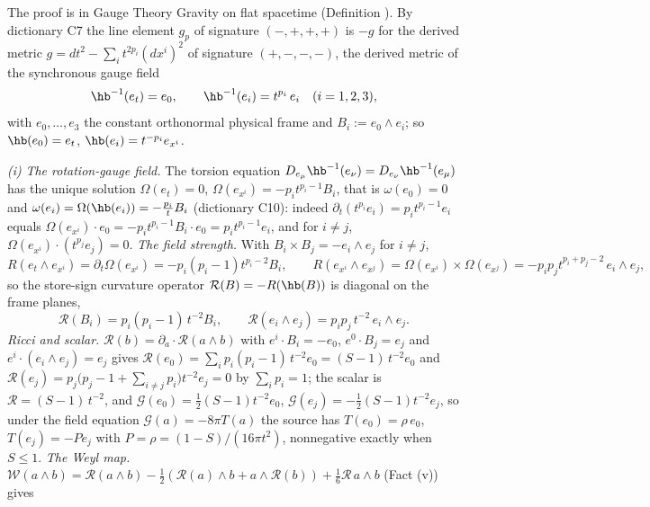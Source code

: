 The proof is in Gauge Theory Gravity on flat spacetime (Definition ). By dictionary C7 the line element $g_{p}$ of signature $(-,+,+,+)$ is $-g$ for the derived metric $g = dt^{2} - \sum_{i}t^{2p_{i}}(dx^{i})^{2}$ of signature $(+,-,-,-)$, the derived metric of the synchronous gauge field
\[
\hb^{-1}(e_{t}) = e_{0}, \qquad \hb^{-1}(e_{i}) = t^{p_{i}}\,e_{i} \quad (i = 1, 2, 3),
\]
with $e_{0}, \dots, e_{3}$ the constant orthonormal physical frame and $B_{i} := e_{0}\wedge e_{i}$; so $\hb(e_{0}) = e_{t}$, $\hb(e_{i}) = t^{-p_{i}}e_{x^{i}}$.

\emph{(i)} \emph{The rotation-gauge field.} The torsion equation $D_{e_\mu}\hb^{-1}(e_\nu) = D_{e_\nu}\hb^{-1}(e_\mu)$ has the unique solution $\Omega(e_{t}) = 0$, $\Omega(e_{x^{i}}) = -p_{i}t^{p_{i}-1}B_{i}$, that is $\omega(e_{0}) = 0$ and $\omega(e_{i}) = \Omega(\hb(e_{i})) = -\tfrac{p_{i}}{t}B_{i}$ (dictionary C10): indeed $\partial_{t}(t^{p_{i}}e_{i}) = p_{i}t^{p_{i}-1}e_{i}$ equals $\Omega(e_{x^{i}})\cdot e_{0} = -p_{i}t^{p_{i}-1}B_{i}\cdot e_{0} = p_{i}t^{p_{i}-1}e_{i}$, and for $i \neq j$, $\Omega(e_{x^{i}})\cdot(t^{p_{j}}e_{j}) = 0$. \emph{The field strength.} With $B_{i}\times B_{j} = -e_{i}\wedge e_{j}$ for $i \neq j$,
\[
R(e_{t}\wedge e_{x^{i}}) = \partial_{t}\Omega(e_{x^{i}}) = -p_{i}(p_{i} - 1)t^{p_{i}-2}B_{i}, \qquad
R(e_{x^{i}}\wedge e_{x^{j}}) = \Omega(e_{x^{i}})\times\Omega(e_{x^{j}}) = -p_{i}p_{j}t^{p_{i}+p_{j}-2}\,e_{i}\wedge e_{j},
\]
so the store-sign curvature operator $\mathcal{R}(B) = -R(\hb(B))$ is diagonal on the frame planes,
\[
\mathcal{R}(B_{i}) = p_{i}(p_{i} - 1)\,t^{-2}B_{i}, \qquad \mathcal{R}(e_{i}\wedge e_{j}) = p_{i}p_{j}\,t^{-2}\,e_{i}\wedge e_{j}.
\]
\emph{Ricci and scalar.} $\mathcal{R}(b) = \partial_{a}\cdot\mathcal{R}(a \wedge b)$ with $e^{i}\cdot B_{i} = -e_{0}$, $e^{0}\cdot B_{j} = e_{j}$ and $e^{i}\cdot(e_{i}\wedge e_{j}) = e_{j}$ gives $\mathcal{R}(e_{0}) = \sum_{i}p_{i}(p_{i} - 1)\,t^{-2}e_{0} = (S - 1)\,t^{-2}e_{0}$ and $\mathcal{R}(e_{j}) = p_{j}\bigl(p_{j} - 1 + \sum_{i \neq j}p_{i}\bigr)t^{-2}e_{j} = 0$ by $\sum_{i}p_{i} = 1$; the scalar is $\mathcal{R} = (S - 1)\,t^{-2}$, and $\mathcal{G}(e_{0}) = \tfrac12(S - 1)t^{-2}e_{0}$, $\mathcal{G}(e_{j}) = -\tfrac12(S - 1)t^{-2}e_{j}$, so under the field equation $\mathcal{G}(a) = -8\pi T(a)$ the source has $T(e_0) = \rho\,e_0$, $T(e_j) = -P e_j$ with $P = \rho = (1 - S)/(16\pi t^{2})$, nonnegative exactly when $S \le 1$. \emph{The Weyl map.} $\mathcal{W}(a \wedge b) = \mathcal{R}(a \wedge b) - \tfrac12(\mathcal{R}(a)\wedge b + a \wedge \mathcal{R}(b)) + \tfrac16\mathcal{R}\,a \wedge b$ (Fact (v)) gives
